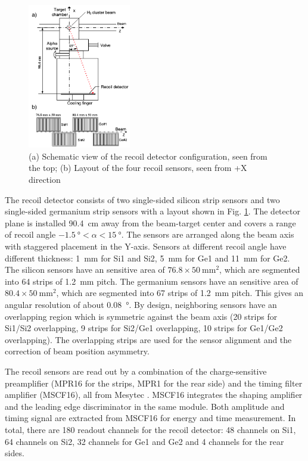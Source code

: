 \documentclass[number,5p]{elsarticle}
\begin{document}
\begin{figure}[htbp]
  \centering
  \includegraphics[width=0.4\textwidth]{./recoil_schematic.png}
  \caption{(a) Schematic view of the recoil detector configuration, seen from the
    top; (b) Layout of the four recoil sensors, seen from +X direction}
  \label{fig:recoil_schematic}
\end{figure}

The recoil detector consists of two single-sided silicon strip sensors and two
single-sided germanium strip sensors with a layout shown in Fig. \ref{fig:recoil_schematic}.
The detector plane is installed \SI{90.4}{\cm} away from the beam-target center
and covers a range of recoil angle $\SI{-1.5}{\degree} < \alpha < \SI{15}{\degree}$.
The sensors are arranged along the beam axis with staggered placement in the Y-axis.
Sensors at different recoil angle have different thickness: \SI{1}{\mm} for Si1
and Si2, \SI{5}{\mm} for Ge1 and \SI{11}{\mm} for Ge2.
The silicon sensors have an sensitive area of $76.8 \times \SI{50}{\mm\squared}$, which are
segmented into 64 strips of \SI{1.2}{\mm} pitch.
The germanium sensors have an sensitive area of \(80.4 \times \SI{50}{\mm\squared}\), which are segmented into 67 strips of \SI{1.2}{\mm} pitch.
This gives an angular resolution of about \SI{0.08}{\degree}.
By design, neighboring sensors have an overlapping region which is symmetric against
the beam axis (20 strips for Si1/Si2 overlapping, 9 strips for Si2/Ge1 overlapping, 10 strips for Ge1/Ge2 overlapping).
The overlapping strips are used for the sensor alignment and the correction of beam position asymmetry.

The recoil sensors are read out by a combination of the charge-sensitive preamplifier (MPR16 for the strips, MPR1 for the rear side) 
and the timing filter amplifier (MSCF16), all from Mesytec \cite{mesytec}. 
MSCF16 integrates the shaping amplifier and the leading edge discriminator in the same module.
Both amplitude and timing signal are extracted from MSCF16 for energy and time measurement.
In total, there are 180 readout channels for the recoil detector: 
48 channels on Si1, 64 channels on Si2, 32 channels for Ge1 and Ge2 and 4
channels for the rear sides. 
\end{document}
